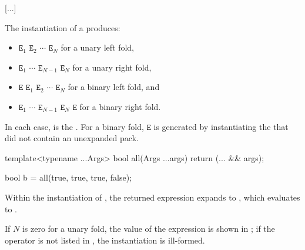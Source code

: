 \documentclass{wg21}
\begin{document}
\textcolor{noteclr}{[...]}


\pnum
The instantiation of a  produces:
\begin{itemize}
	\item
	\tcode{(}\space
	\tcode{((}$\mathtt{E}_1$
	 $\mathtt{E}_2$\tcode{)}
	 $\cdots$\tcode{)}
	 $\mathtt{E}_N$
	\space\tcode{)}
	for a unary left fold,
	\item
	\tcode{(}\space
	$\mathtt{E}_1$     
	\tcode{(}$\cdots$           
	\tcode{(}$\mathtt{E}_{N-1}$ 
	$\mathtt{E}_N$\tcode{))}
	\space\tcode{)}
	for a unary right fold,
	\item
	\tcode{(}\space
	\tcode{(((}$\mathtt{E}$
	 $\mathtt{E}_1$\tcode{)}
	 $\mathtt{E}_2$\tcode{)}
	 $\cdots$\tcode{)}
	 $\mathtt{E}_N$
	\space\tcode{)}
	for a binary left fold, and
	\item
	\tcode{(}\space
	$\mathtt{E}_1$     
	\tcode{(}$\cdots$           
	\tcode{(}$\mathtt{E}_{N-1}$ 
	\tcode{(}$\mathtt{E}_{N}$   
	$\mathtt{E}$\tcode{)))}
	\space\tcode{)}
	for a binary right fold.
\end{itemize}

In each case,
 is the .
For a binary fold,
$\mathtt{E}$ is generated
by instantiating the 
that did not contain an unexpanded pack.
\begin{example}
	\begin{codeblock}
		template<typename ...Args>
		bool all(Args ...args) { return (... && args); }

		bool b = all(true, true, true, false);
	\end{codeblock}
	Within the instantiation of ,
	the returned expression expands to
	,
	which evaluates to .
\end{example}
If $N$ is zero for a unary fold,
the value of the expression is shown in ;
if the operator is not listed in ,
the instantiation is ill-formed.
\end{document}

